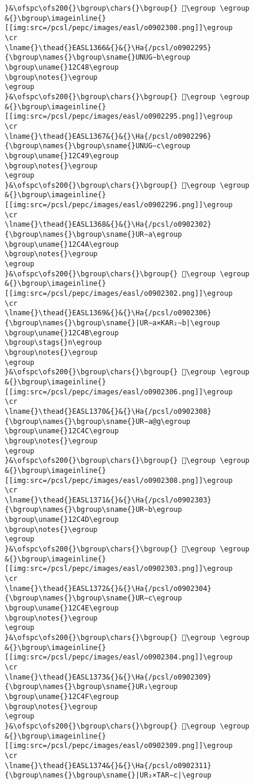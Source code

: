 \begin{verbatim}
}&\ofspc\ofs200{}\bgroup\chars{}\bgroup{} 𒱅\egroup \egroup
&{}\bgroup\imageinline{}[[img:src=/pcsl/pepc/images/easl/o0902300.png]]\egroup
\cr
\lname{}\thead{}EASL1366&{}&{}\Ha{/pcsl/o0902295}{\bgroup\names{}\bgroup\sname{}UNUG∼b\egroup
\bgroup\uname{}12C48\egroup
\bgroup\notes{}\egroup
\egroup
}&\ofspc\ofs200{}\bgroup\chars{}\bgroup{} 𒱈\egroup \egroup
&{}\bgroup\imageinline{}[[img:src=/pcsl/pepc/images/easl/o0902295.png]]\egroup
\cr
\lname{}\thead{}EASL1367&{}&{}\Ha{/pcsl/o0902296}{\bgroup\names{}\bgroup\sname{}UNUG∼c\egroup
\bgroup\uname{}12C49\egroup
\bgroup\notes{}\egroup
\egroup
}&\ofspc\ofs200{}\bgroup\chars{}\bgroup{} 𒱉\egroup \egroup
&{}\bgroup\imageinline{}[[img:src=/pcsl/pepc/images/easl/o0902296.png]]\egroup
\cr
\lname{}\thead{}EASL1368&{}&{}\Ha{/pcsl/o0902302}{\bgroup\names{}\bgroup\sname{}UR∼a\egroup
\bgroup\uname{}12C4A\egroup
\bgroup\notes{}\egroup
\egroup
}&\ofspc\ofs200{}\bgroup\chars{}\bgroup{} 𒱊\egroup \egroup
&{}\bgroup\imageinline{}[[img:src=/pcsl/pepc/images/easl/o0902302.png]]\egroup
\cr
\lname{}\thead{}EASL1369&{}&{}\Ha{/pcsl/o0902306}{\bgroup\names{}\bgroup\sname{}|UR∼a×KAR₂∼b|\egroup
\bgroup\uname{}12C4B\egroup
\bgroup\stags{}n\egroup
\bgroup\notes{}\egroup
\egroup
}&\ofspc\ofs200{}\bgroup\chars{}\bgroup{} 𒱋\egroup \egroup
&{}\bgroup\imageinline{}[[img:src=/pcsl/pepc/images/easl/o0902306.png]]\egroup
\cr
\lname{}\thead{}EASL1370&{}&{}\Ha{/pcsl/o0902308}{\bgroup\names{}\bgroup\sname{}UR∼a@g\egroup
\bgroup\uname{}12C4C\egroup
\bgroup\notes{}\egroup
\egroup
}&\ofspc\ofs200{}\bgroup\chars{}\bgroup{} 𒱌\egroup \egroup
&{}\bgroup\imageinline{}[[img:src=/pcsl/pepc/images/easl/o0902308.png]]\egroup
\cr
\lname{}\thead{}EASL1371&{}&{}\Ha{/pcsl/o0902303}{\bgroup\names{}\bgroup\sname{}UR∼b\egroup
\bgroup\uname{}12C4D\egroup
\bgroup\notes{}\egroup
\egroup
}&\ofspc\ofs200{}\bgroup\chars{}\bgroup{} 𒱍\egroup \egroup
&{}\bgroup\imageinline{}[[img:src=/pcsl/pepc/images/easl/o0902303.png]]\egroup
\cr
\lname{}\thead{}EASL1372&{}&{}\Ha{/pcsl/o0902304}{\bgroup\names{}\bgroup\sname{}UR∼c\egroup
\bgroup\uname{}12C4E\egroup
\bgroup\notes{}\egroup
\egroup
}&\ofspc\ofs200{}\bgroup\chars{}\bgroup{} 𒱎\egroup \egroup
&{}\bgroup\imageinline{}[[img:src=/pcsl/pepc/images/easl/o0902304.png]]\egroup
\cr
\lname{}\thead{}EASL1373&{}&{}\Ha{/pcsl/o0902309}{\bgroup\names{}\bgroup\sname{}UR₂\egroup
\bgroup\uname{}12C4F\egroup
\bgroup\notes{}\egroup
\egroup
}&\ofspc\ofs200{}\bgroup\chars{}\bgroup{} 𒱏\egroup \egroup
&{}\bgroup\imageinline{}[[img:src=/pcsl/pepc/images/easl/o0902309.png]]\egroup
\cr
\lname{}\thead{}EASL1374&{}&{}\Ha{/pcsl/o0902311}{\bgroup\names{}\bgroup\sname{}|UR₂×TAR∼c|\egroup

\end{verbatim}
